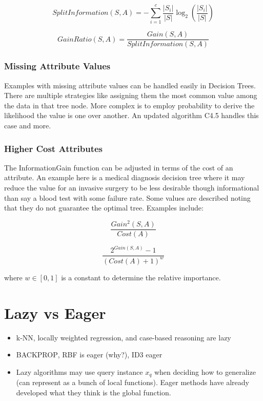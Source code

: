 \documentclass[11pt]{article}
\begin{document}
\begin{equation}
SplitInformation(S,A) = -\sum_{i=1}^{c} \frac{|S_i|}{|S|} \log_2(\frac{|S_i|}{|S|})
\end{equation}

\begin{equation}
GainRatio(S,A) = \frac{Gain(S, A)}{SplitInformation(S, A)}
\end{equation}

\subsubsection*{Missing Attribute Values}

Examples with missing attribute values can be handled easily in Decision Trees. There are multiple strategies like assigning them the most common value among the data in that tree node. More complex is to employ probability to derive the likelihood the value is one over another. An updated algorithm C4.5 handles this case and more.

\subsubsection*{Higher Cost Attributes}

The InformationGain function can be adjusted in terms of the cost of an attribute. An example here is a medical diagnosis decision tree where it may reduce the value for an invasive surgery to be less desirable though informational than say a blood test with some failure rate. Some values are described noting that they do not guarantee the optimal tree. Examples include:

\begin{equation}
\frac{Gain^2(S, A)}{Cost(A)}
\end{equation}

\begin{equation}
\frac{2^{Gain(S, A)} - 1}{(Cost(A) + 1)^w}
\end{equation}

where $w \in [0, 1]$ is a constant to determine the relative importance.

\section{Lazy vs Eager}
\begin{itemize}
\item k-NN, locally weighted regression, and case-based reasoning are lazy
\item \textsc{BACKPROP}, RBF is eager (why?), ID3 eager
\item Lazy algorithms may use query instance $x_q$ when deciding how to generalize (can represent as a bunch of local functions). Eager methods have already developed what they think is the global function.
\end{itemize}
\end{document}
